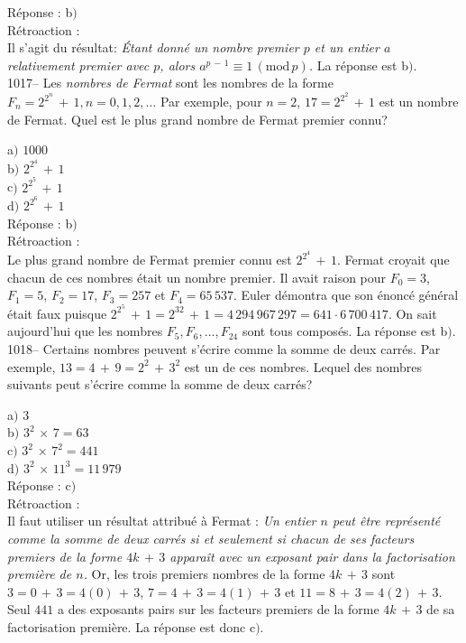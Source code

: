 ﻿\documentclass[letterpaper, 12pt]{article}
\begin{document}
R\'eponse : b$)$\\

R\'etroaction : \\
Il s'agit du r\'esultat: {\sl \'Etant donn\'e un nombre premier $p$
et un entier $a$ relativement premier avec $p$, alors
$a^{p\,-\,1}\equiv1\,(\mathrm{mod}\,p)$.}
La r\'eponse est b$)$.\\

1017-- Les {\sl nombres de Fermat} sont les nombres de la forme
$F_n=2^{2^n}\,+\,1, n=0,1,2,\ldots$ Par exemple, pour $n=2$,
$17=2^{2^2}\,+\,1$ est un nombre de Fermat. Quel est le plus grand
nombre de Fermat premier connu?

a$)$ $1000$ \\
b$)$ $2^{2^4}\,+\,1$ \\
c$)$ $2^{2^5}\,+\,1$ \\
d$)$ $2^{2^6}\,+\,1$\\

R\'eponse : b$)$\\

R\'etroaction : \\
Le plus grand nombre de Fermat premier connu est $2^{2^4}\,+\,1$.
Fermat croyait que chacun de ces nombres \'etait un nombre premier.
Il avait raison pour $F_0=3$, $F_1=5$, $F_2=17$, $F_3=257$ et
$F_4=65\,537$. Euler d\'emontra que son \'enonc\'e g\'en\'eral
\'etait faux puisque
$2^{2^5}\,+\,1=2^{32}\,+\,1=4\,294\,967\,297=641\cdot6\,700\,417$.
On sait aujourd'hui que les nombres $F_5,F_6,\ldots,F_{24}$ sont
tous compos\'es.
La r\'eponse est b$)$.\\

1018-- Certains nombres peuvent s'\'ecrire comme la somme de deux
carr\'es. Par exemple, $13=4\,+\,9=2^2\,+\,3^2$ est un de ces
nombres. Lequel des nombres suivants peut s'\'ecrire comme la somme
de deux carr\'es?

a$)$ $3$ \\
b$)$ $3^2\,\times\,7=63$\\
c$)$ $3^2\,\times\,7^2=441$ \\
d$)$ $3^2\,\times\,11^3=11\,979$\\

R\'eponse : c$)$\\

R\'etroaction : \\
Il faut utiliser un r\'esultat attribu\'e \`a Fermat : {\sl Un
entier $n$ peut \^etre repr\'esent\'e comme la somme de deux
carr\'es si et seulement si chacun de ses facteurs premiers de la
forme $4k\,+\,3$ appara\^it avec un exposant pair dans la
factorisation premi\`ere de $n$.} Or, les trois premiers nombres de
la forme $4k\,+\,3$ sont $3=0\,+\,3=4(0)\,+\,3$,
$7=4\,+\,3=4(1)\,+\,3$ et $11=8\,+\,3=4(2)\,+\,3$. Seul $441$ a des
exposants pairs sur les facteurs premiers de la forme $4k\,+\,3$ de
sa factorisation premi\`ere.
La r\'eponse est donc c$)$.\\
\end{document}
